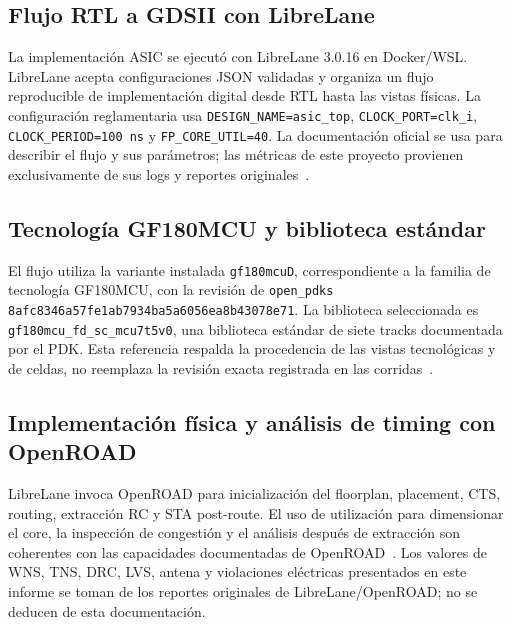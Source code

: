 % 
% 
%
% 

\subsection{Flujo RTL a GDSII con LibreLane}
La implementación ASIC se ejecutó con LibreLane 3.0.16 en Docker/WSL. LibreLane
acepta configuraciones JSON validadas y organiza un flujo reproducible de
implementación digital desde RTL hasta las vistas físicas. La configuración
reglamentaria usa \texttt{DESIGN\_NAME=asic\_top}, \texttt{CLOCK\_PORT=clk\_i},
\texttt{CLOCK\_PERIOD=100 ns} y \texttt{FP\_CORE\_UTIL=40}.
La documentación oficial se usa para describir el flujo y sus parámetros;
las métricas de este proyecto provienen exclusivamente de sus logs y reportes
originales~\cite{librelane_docs}.

\subsection{Tecnología GF180MCU y biblioteca estándar}
El flujo utiliza la variante instalada \texttt{gf180mcuD}, correspondiente a
la familia de tecnología GF180MCU, con la revisión de \texttt{open\_pdks}
\texttt{8afc8346a57fe1ab7934ba5a6056ea8b43078e71}. La biblioteca seleccionada
es \texttt{gf180mcu\_fd\_sc\_mcu7t5v0}, una biblioteca estándar de siete
tracks documentada por el PDK. Esta referencia respalda la procedencia de las
vistas tecnológicas y de celdas, no reemplaza la revisión exacta registrada en
las corridas~\cite{gf180mcu_pdk_docs}.

\subsection{Implementación física y análisis de timing con OpenROAD}
LibreLane invoca OpenROAD para inicialización del floorplan, placement, CTS,
routing, extracción RC y STA post-route. El uso de utilización para dimensionar
el core, la inspección de congestión y el análisis después de extracción son
coherentes con las capacidades documentadas de OpenROAD~\cite{openroad_docs}.
Los valores de WNS, TNS, DRC, LVS, antena y violaciones eléctricas presentados
en este informe se toman de los reportes originales de LibreLane/OpenROAD; no
se deducen de esta documentación.
